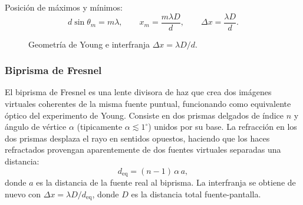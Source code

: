 \documentclass[12pt, a4paper]{article}
\theoremstyle{plain}
\theoremstyle{definition}
\theoremstyle{remark}
\begin{document}
Posición de máximos y mínimos:
\begin{equation}
  d\sin\theta_m=m\lambda,\qquad
  x_m=\frac{m\lambda D}{d},\qquad
  \Delta x=\frac{\lambda D}{d}.
  \label{eq:young_interfranja_t6}
\end{equation}

\begin{figure}[ht]
  \centering
  \caption{Geometría de Young e interfranja $\Delta x=\lambda D/d$.}
  \label{fig:young_t6}
\end{figure}

\subsubsection{Biprisma de Fresnel}

El biprisma de Fresnel es una lente divisora de haz que crea dos imágenes
virtuales coherentes de la misma fuente puntual, funcionando como equivalente
óptico del experimento de Young. Consiste en dos prismas delgados de índice
$n$ y ángulo de vértice $\alpha$ (tipicamente $\alpha \lesssim 1^\circ$) unidos
por su base. La refracción en los dos prismas desplaza el rayo en sentidos
opuestos, haciendo que los haces refractados provengan aparentemente de dos
fuentes virtuales separadas una distancia:
\begin{equation}
  d_{\mathrm{eq}}=(n-1)\,\alpha\,a,
  \label{eq:biprisma_sep_t6}
\end{equation}
donde $a$ es la distancia de la fuente real al biprisma. La interfranja se
obtiene de nuevo con $\Delta x=\lambda D/d_{\mathrm{eq}}$, donde $D$ es la
distancia total fuente-pantalla.
\end{document}
